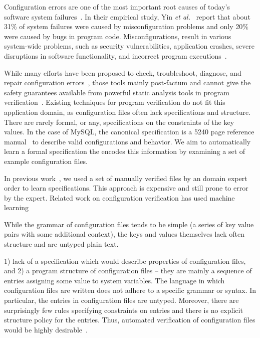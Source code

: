Configuration errors are one of the most important root causes of today's software system failures~\cite{xu15systems, yin11anempirical}.
In their empirical study, Yin {\em et al.}~\cite{yin11anempirical} report that about 31\% of system failures were caused by misconfiguration problems and only 20\% were caused by bugs in program code. 
Misconfigurations, result in various system-wide problems, such as security vulnerabilities, application crashes, severe disruptions in software functionality, and incorrect program executions~\cite{zhang14encore, yuan11context, xu13do, xu15hey}.  

While many efforts have been proposed to check, troubleshoot, diagnose, and repair configuration errors~\cite{attariyan10automating,su07autobash, whitaker04configuration},
  those tools mainly post-factum and cannot give the safety guarantees available from powerful static analysis tools in program verification~\cite{Leino10Dafny, PiskacWZ14, BobotFMP15}.
Existing techniques for program verification do not fit this application domain, as configuration files often lack specifications and structure.
There are rarely formal, or any, specifications on the constraints of the key values.
In the case of MySQL, the canonical specification is a 5240 page reference manual~\cite{mysql-manual15} to describe valid configurations and behavior.
We aim to automatically learn a formal specification the encodes this information by examining a set of example configuration files.

In previous work~\cite{santolucitoCAV}, we used a set of manually verified files by an domain expert order to learn specifications.
This approach is expensive and still prone to error by the expert.
Related work on configuration verification has used machine learning

While the grammar of configuration files tends to be simple (a series of key value pairs with some additional context), the keys and values themselves lack often structure and are untyped plain text.

   1) lack of a specification which would describe properties of configuration files, and 
   2) a program structure of configuration files -- they are mainly a sequence of entries assigning some value to system variables. 
The language in which configuration files are written does not adhere to a specific grammar or syntax. 
In particular, the entries in configuration files are untyped. 
Moreover, there are surprisingly few rules specifying constraints on entries and there is no explicit structure policy for the entries.
Thus, automated verification of configuration files would be highly desirable~\cite{wang04automatic, zhang14encore, xu15systems}.

